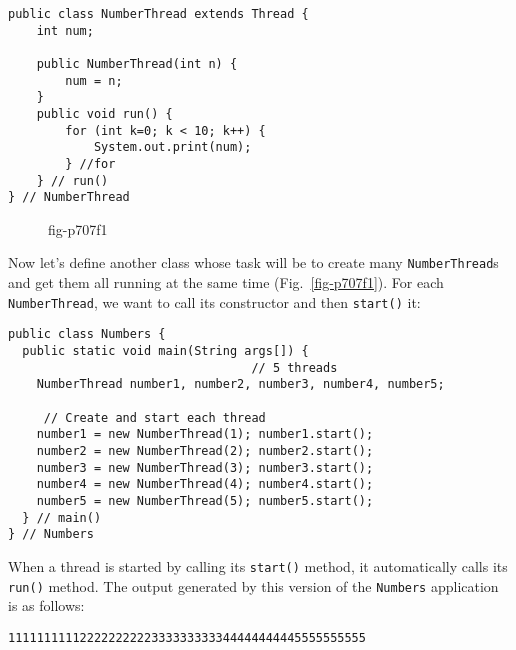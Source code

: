 \begin{jjjlisting}
\begin{lstlisting}
public class NumberThread extends Thread {
    int num;

    public NumberThread(int n) {
        num = n;
    }
    public void run() {
        for (int k=0; k < 10; k++) {
            System.out.print(num);
        } //for
    } // run()
} // NumberThread
\end{lstlisting}
\end{jjjlisting}

\begin{figure}[tb]
{fig-p707f1}
\end{figure}

\noindent Now let's define another class whose task will be to 
create many \mbox{\tt NumberThread}s and get them all running at the
same time (Fig.~\ref{fig-p707f1}).  For each {\tt NumberThread}, we
want to call its constructor and then {\tt start()} it:

\begin{jjjlisting}[27pc]
\begin{lstlisting}
public class Numbers {
  public static void main(String args[]) {
                                  // 5 threads
    NumberThread number1, number2, number3, number4, number5; 

     // Create and start each thread
    number1 = new NumberThread(1); number1.start(); 
    number2 = new NumberThread(2); number2.start();
    number3 = new NumberThread(3); number3.start();
    number4 = new NumberThread(4); number4.start();
    number5 = new NumberThread(5); number5.start();
  } // main()
} // Numbers
\end{lstlisting}
\end{jjjlisting}

\noindent When a thread is started by calling its {\tt start()}
method, it automatically calls its
{\tt run()} method.  The output generated by this version of the
{\tt Numbers} application is as follows:

\begin{jjjlisting}
\begin{lstlisting}
11111111112222222222333333333344444444445555555555
\end{lstlisting}
\end{jjjlisting}

